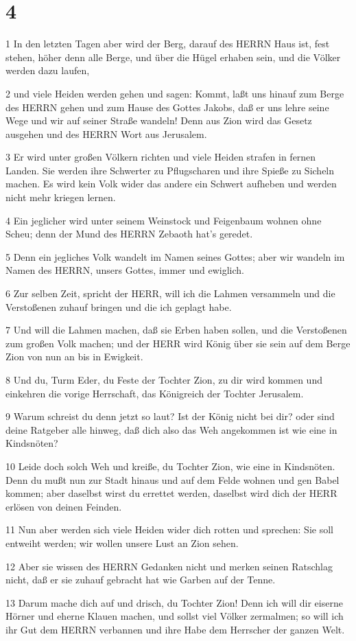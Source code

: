 \chapter{4}

\par 1 In den letzten Tagen aber wird der Berg, darauf des HERRN Haus ist, fest stehen, höher denn alle Berge, und über die Hügel erhaben sein, und die Völker werden dazu laufen,
\par 2 und viele Heiden werden gehen und sagen: Kommt, laßt uns hinauf zum Berge des HERRN gehen und zum Hause des Gottes Jakobs, daß er uns lehre seine Wege und wir auf seiner Straße wandeln! Denn aus Zion wird das Gesetz ausgehen und des HERRN Wort aus Jerusalem.
\par 3 Er wird unter großen Völkern richten und viele Heiden strafen in fernen Landen. Sie werden ihre Schwerter zu Pflugscharen und ihre Spieße zu Sicheln machen. Es wird kein Volk wider das andere ein Schwert aufheben und werden nicht mehr kriegen lernen.
\par 4 Ein jeglicher wird unter seinem Weinstock und Feigenbaum wohnen ohne Scheu; denn der Mund des HERRN Zebaoth hat's geredet.
\par 5 Denn ein jegliches Volk wandelt im Namen seines Gottes; aber wir wandeln im Namen des HERRN, unsers Gottes, immer und ewiglich.
\par 6 Zur selben Zeit, spricht der HERR, will ich die Lahmen versammeln und die Verstoßenen zuhauf bringen und die ich geplagt habe.
\par 7 Und will die Lahmen machen, daß sie Erben haben sollen, und die Verstoßenen zum großen Volk machen; und der HERR wird König über sie sein auf dem Berge Zion von nun an bis in Ewigkeit.
\par 8 Und du, Turm Eder, du Feste der Tochter Zion, zu dir wird kommen und einkehren die vorige Herrschaft, das Königreich der Tochter Jerusalem.
\par 9 Warum schreist du denn jetzt so laut? Ist der König nicht bei dir? oder sind deine Ratgeber alle hinweg, daß dich also das Weh angekommen ist wie eine in Kindsnöten?
\par 10 Leide doch solch Weh und kreiße, du Tochter Zion, wie eine in Kindsnöten. Denn du mußt nun zur Stadt hinaus und auf dem Felde wohnen und gen Babel kommen; aber daselbst wirst du errettet werden, daselbst wird dich der HERR erlösen von deinen Feinden.
\par 11 Nun aber werden sich viele Heiden wider dich rotten und sprechen: Sie soll entweiht werden; wir wollen unsere Lust an Zion sehen.
\par 12 Aber sie wissen des HERRN Gedanken nicht und merken seinen Ratschlag nicht, daß er sie zuhauf gebracht hat wie Garben auf der Tenne.
\par 13 Darum mache dich auf und drisch, du Tochter Zion! Denn ich will dir eiserne Hörner und eherne Klauen machen, und sollst viel Völker zermalmen; so will ich ihr Gut dem HERRN verbannen und ihre Habe dem Herrscher der ganzen Welt.

